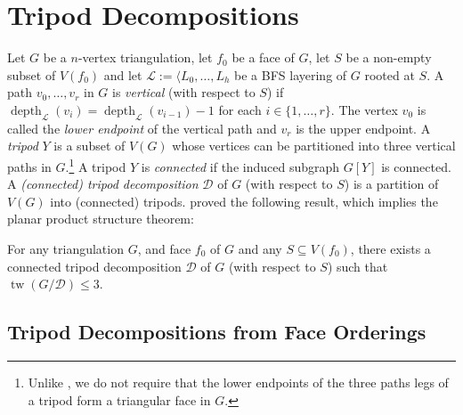 \documentclass{patmorin}
\DeclareMathOperator{\tw}{tw}
\DeclareMathOperator{\depth}{depth}
\begin{document}
\section{Tripod Decompositions}


Let $G$ be a $n$-vertex triangulation, let $f_0$ be a face of $G$, let $S$ be a non-empty subset of $V(f_0)$ and let $\mathcal{L}:=\langle L_0,\ldots,L_h$ be a BFS layering of $G$ rooted at $S$.  A path $v_0,\ldots,v_r$ in $G$ is \emph{vertical} (with respect to $S$) if $\depth_\mathcal{L}(v_i)=\depth_{\mathcal{L}}(v_{i-1})-1$ for each $i\in\{1,\ldots,r\}$. The vertex $v_0$ is called the \emph{lower endpoint} of the vertical path and $v_r$ is the upper endpoint. A \emph{tripod} $Y$ is a subset of $V(G)$ whose vertices can be partitioned into three vertical paths in $G$.\footnote{Unlike \cite{dujmovic.joret.ea:planar}, we do not require that the lower endpoints of the three paths legs of a tripod form a triangular face in $G$.}
A tripod $Y$ is \emph{connected} if the induced subgraph $G[Y]$ is connected.  A \emph{(connected) tripod decomposition} $\mathcal{D}$ of $G$ (with respect to $S$) is a partition of $V(G)$ into (connected) tripods.  \citet{dujmovic.joret.ea:planar} proved the following result, which implies the planar product structure theorem:

\begin{thm}\label{tripod_decomposition}
  For any triangulation $G$, and face $f_0$ of $G$ and any $S\subseteq V(f_0)$, there exists a connected tripod decomposition $\mathcal{D}$ of $G$ (with respect to $S$) such that $\tw(G/\mathcal{D})\le 3$.
\end{thm}


\subsection{Tripod Decompositions from Face Orderings}
\end{document}

